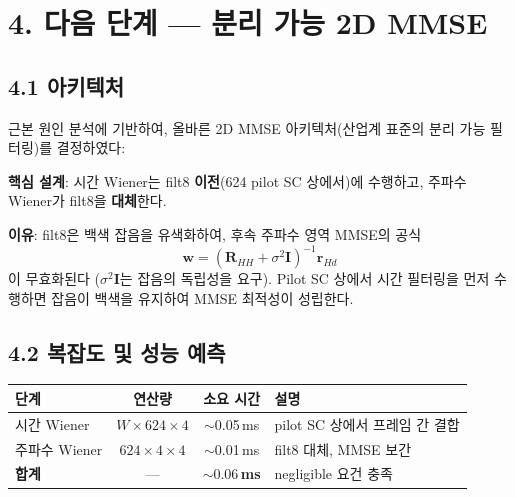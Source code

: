 \documentclass[11pt,a4paper]{article}
\begin{document}
\section{4. 다음 단계 — 분리 가능 2D MMSE}

\subsection{4.1 아키텍처}

근본 원인 분석에 기반하여, 올바른 2D MMSE 아키텍처(산업계 표준의 분리 가능 필터링)를 결정하였다:

\begin{center}
\end{center}

\textbf{핵심 설계}: 시간 Wiener는 filt8 \textbf{이전}(624 pilot SC 상에서)에 수행하고, 주파수 Wiener가 filt8을 \textbf{대체}한다.

\textbf{이유}: filt8은 백색 잡음을 유색화하여, 후속 주파수 영역 MMSE의 공식
\[
\mathbf{w} = \left(\mathbf{R}_{HH} + \sigma^2 \mathbf{I}\right)^{-1} \mathbf{r}_{Hd}
\]
이 무효화된다 ($\sigma^2 \mathbf{I}$는 잡음의 독립성을 요구). Pilot SC 상에서 시간 필터링을 먼저 수행하면 잡음이 백색을 유지하여 MMSE 최적성이 성립한다.

\subsection{4.2 복잡도 및 성능 예측}

\begin{table}[h]\centering
\begin{tabular}{lccl}
\toprule
단계 & 연산량 & 소요 시간 & 설명 \\
\midrule
시간 Wiener & $W \times 624 \times 4$ & $\sim$0.05\,ms & pilot SC 상에서 프레임 간 결합 \\
주파수 Wiener & $624 \times 4 \times 4$ & $\sim$0.01\,ms & filt8 대체, MMSE 보간 \\
\midrule
\textbf{합계} & --- & $\mathbf{\sim 0.06}$\,\textbf{ms} & negligible 요건 충족 \\
\bottomrule
\end{tabular}
\end{table}
\end{document}

